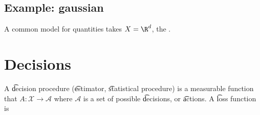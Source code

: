 \subsection*{Example: gaussian}

A common model for quantities takes $X = \R ^d$, the .


\section*{Decisions}

A \t{decision procedure} (\t{estimator}, \t{statistical procedure}) is a measurable function that $A: \mathcal{X}  \to \mathcal{A} $ where $\mathcal{A} $ is a set of possible \t{decisions}, or \t{actions}.
A \t{loss function} is
\blankpage

